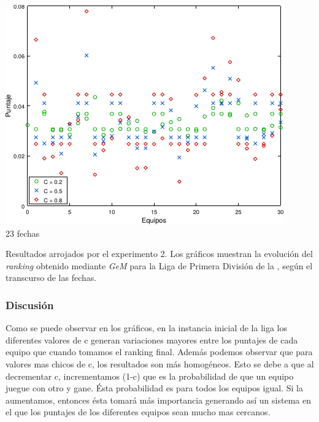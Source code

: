             \noindent{} \begin{minipage}{\textwidth}
                \begin{center}
                    \includegraphics{graficos/exp2-partidos-liga-afa2.pdf} \\
                    {\small 23 fechas}

                    \vspace{1em}

                    Resultados arrojados por el experimento 2. Los gráficos muestran la evolución del \emph{ranking} obtenido mediante \emph{GeM} para la Liga de Primera División de la , según el transcurso de las fechas.

                    \vspace{1em}
                \end{center}
            \end{minipage}


            \subsubsection*{Discusión}
            Como se puede observar en los gráficos, en la instancia inicial de la liga los diferentes valores de c generan variaciones mayores entre los puntajes de cada equipo que cuando tomamos el ranking final.
            Además podemos observar que para valores mas chicos de c, los resultados son más homogéneos. Esto se debe a que al decrementar c, incrementamos (1-c) que es la probabilidad de que un equipo juegue con otro y gane. Ésta probabilidad es para todos los equipos igual. Si la aumentamos, entonces ésta tomará más importancia generando así un sistema en el que los puntajes de los diferentes equipos sean mucho mas cercanos.


